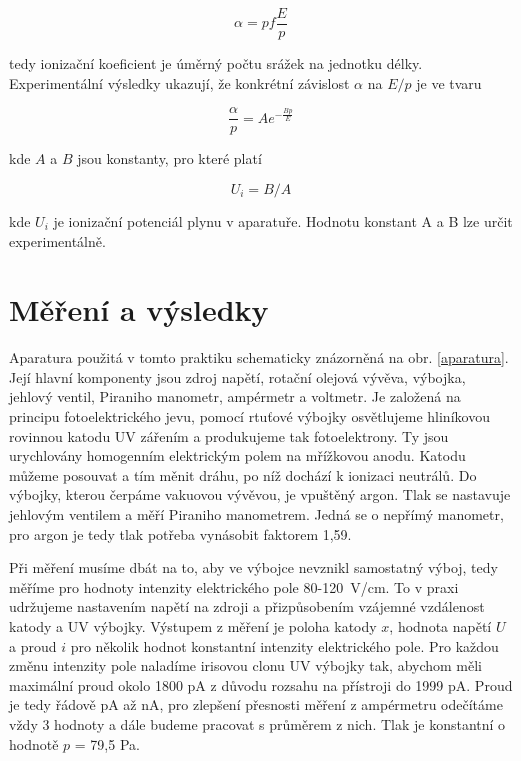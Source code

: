 \documentclass[a4paper,12pt]{article}
\begin{document}
\begin{equation}
	\alpha = p f \frac{E}{p}
	\label{4}
\end{equation}

tedy ionizační koeficient je úměrný počtu srážek na jednotku délky. Experimentální výsledky ukazují, že konkrétní závislost $\alpha$ na $E/p$ je ve tvaru

\begin{equation}
	\frac{\alpha}{p} = A e^{-\frac{Bp}{E}} 
	\label{5}
\end{equation}

kde $A$ a $B$ jsou konstanty, pro které platí

\begin{equation}
	U_i = B/A
	\label{6}
\end{equation}

kde $U_i$ je ionizační potenciál plynu v aparatuře. Hodnotu konstant A a B lze určit experimentálně.

\section{Měření a výsledky}

Aparatura použitá v tomto praktiku schematicky znázorněná na obr. \ref{aparatura}. Její hlavní komponenty jsou zdroj napětí, rotační olejová vývěva, výbojka, jehlový ventil, Piraniho manometr, ampérmetr a voltmetr. Je založená na principu fotoelektrického jevu, pomocí rtuťové výbojky osvětlujeme hliníkovou rovinnou katodu UV zářením a produkujeme tak fotoelektrony. Ty jsou urychlovány homogenním elektrickým polem na mřížkovou anodu. Katodu můžeme posouvat a tím měnit dráhu, po níž dochází k ionizaci neutrálů. Do výbojky, kterou čerpáme vakuovou vývěvou, je vpuštěný argon. Tlak se nastavuje jehlovým ventilem a měří Piraniho manometrem. Jedná se o nepřímý manometr, pro argon je tedy tlak potřeba vynásobit faktorem 1,59.

Při měření musíme dbát na to, aby ve výbojce nevznikl samostatný výboj, tedy měříme pro hodnoty intenzity elektrického pole 80-120~V/cm. To v praxi udržujeme nastavením napětí na zdroji a přizpůsobením vzájemné vzdálenost katody a UV výbojky. Výstupem z měření je poloha katody $x$, hodnota napětí $U$ a proud $i$ pro několik hodnot konstantní intenzity elektrického pole. Pro každou změnu intenzity pole naladíme irisovou clonu UV výbojky tak, abychom měli maximální proud okolo 1800 pA z důvodu rozsahu na přístroji do 1999 pA. Proud je tedy řádově pA až nA, pro zlepšení přesnosti měření z ampérmetru odečítáme vždy 3 hodnoty a dále budeme pracovat s průměrem z nich. Tlak je konstantní o hodnotě $p$ = 79,5 Pa.
\end{document}
